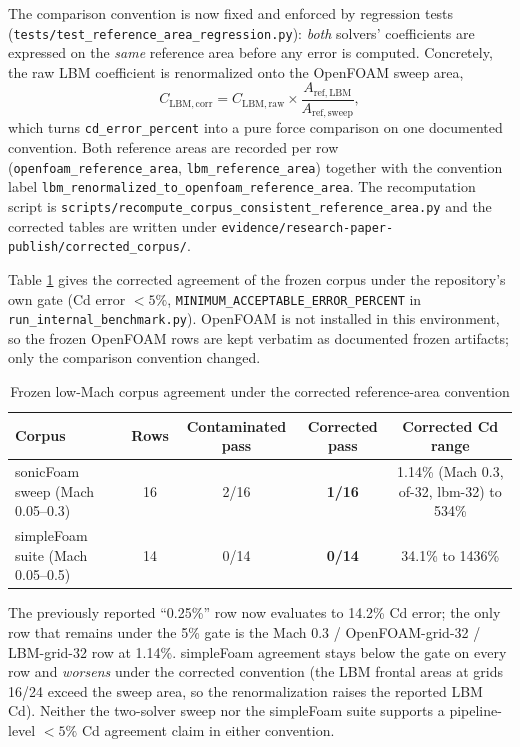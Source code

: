 The comparison convention is now fixed and enforced by regression tests (\texttt{tests/test\_reference\_area\_regression.py}): \emph{both} solvers' coefficients are expressed on the \emph{same} reference area before any error is computed. Concretely, the raw LBM coefficient is renormalized onto the OpenFOAM sweep area,
\[
C_{\mathrm{LBM,corr}} = C_{\mathrm{LBM,raw}} \times \frac{A_{\mathrm{ref,LBM}}}{A_{\mathrm{ref,sweep}}},
\]
which turns \texttt{cd\_error\_percent} into a pure force comparison on one documented convention. Both reference areas are recorded per row (\texttt{openfoam\_reference\_area}, \texttt{lbm\_reference\_area}) together with the convention label \texttt{lbm\_renormalized\_to\_openfoam\_reference\_area}. The recomputation script is \texttt{scripts/recompute\_corpus\_consistent\_reference\_area.py} and the corrected tables are written under \texttt{evidence/research-paper-publish/corrected\_corpus/}.

Table \ref{tab:frozen_corpus_corrected} gives the corrected agreement of the frozen corpus under the repository's own gate (Cd error \(< 5\%\), \texttt{MINIMUM\_ACCEPTABLE\_ERROR\_PERCENT} in \texttt{run\_internal\_benchmark.py}). OpenFOAM is not installed in this environment, so the frozen OpenFOAM rows are kept verbatim as documented frozen artifacts; only the comparison convention changed.

\begin{table}[!t]
\centering
\caption{Frozen low-Mach corpus agreement under the corrected reference-area convention}
\label{tab:frozen_corpus_corrected}
\footnotesize
\setlength{\tabcolsep}{2pt}
\begin{tabular}{|l|c|c|c|c|}
\hline
\textbf{Corpus} & \textbf{Rows} & \textbf{Contaminated pass} & \textbf{Corrected pass} & \textbf{Corrected Cd range} \\ \hline
sonicFoam sweep (Mach 0.05--0.3) & 16 & 2/16 & \textbf{1/16} & 1.14\% (Mach 0.3, of-32, lbm-32) to 534\% \\
simpleFoam suite (Mach 0.05--0.5) & 14 & 0/14 & \textbf{0/14} & 34.1\% to 1436\% \\ \hline
\end{tabular}
\end{table}

The previously reported ``0.25\%'' row now evaluates to 14.2\% Cd error; the only row that remains under the 5\% gate is the Mach 0.3 / OpenFOAM-grid-32 / LBM-grid-32 row at 1.14\%. simpleFoam agreement stays below the gate on every row and \emph{worsens} under the corrected convention (the LBM frontal areas at grids 16/24 exceed the sweep area, so the renormalization raises the reported LBM Cd). Neither the two-solver sweep nor the simpleFoam suite supports a pipeline-level \(<5\%\) Cd agreement claim in either convention.

